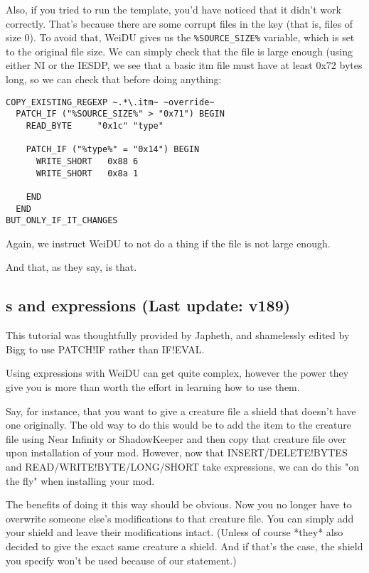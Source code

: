 \documentclass{article}
\def\ttref#1{\ahrefloc{#1}{\tt #1}}
\begin{document}
Also, if you tried to run the template, you'd have noticed that it didn't work
correctly. That's because there are some corrupt files in the key (that is,
files of size 0). To avoid that, WeiDU gives us the \verb+%SOURCE_SIZE%+ variable,
which is set to the original file size. We can simply check that the file is
large enough (using either NI or the IESDP, we see that a basic itm file must
have at least 0x72 bytes long, so we can check that before doing anything:

\begin{verbatim}
COPY_EXISTING_REGEXP ~.*\.itm~ ~override~
  PATCH_IF ("%SOURCE_SIZE%" > "0x71") BEGIN
    READ_BYTE     "0x1c" "type"
  
    PATCH_IF ("%type%" = "0x14") BEGIN
      WRITE_SHORT   0x88 6
      WRITE_SHORT   0x8a 1
  
    END
  END
BUT_ONLY_IF_IT_CHANGES
\end{verbatim}

Again, we instruct WeiDU to not do a thing if the file is not large enough.

And that, as they say, is that.

\subsection{\ttref{value}s and expressions  (Last update: v189)}
This tutorial was thoughtfully provided by Japheth, and shamelessly edited
by Bigg to use PATCH!IF rather than IF!EVAL.

Using expressions with WeiDU can get quite complex, however the power they
give you is more than worth the effort in learning how to use them.

Say, for instance, that you want to give a creature file a shield that
doesn't have one originally.  The old way to do this would be to add the
item to the creature file using Near Infinity or ShadowKeeper and then copy
that creature file over upon installation of your mod.  However, now that
INSERT/DELETE!BYTES and READ/WRITE!BYTE/LONG/SHORT take expressions, we can
do this "on the fly" when installing your mod.

The benefits of doing it this way should be obvious.  Now you no longer
have to overwrite someone else's modifications to that creature file.  You
can simply add your shield and leave their modifications intact.  (Unless
of course *they* also decided to give the exact same creature a shield.
And if that's the case, the shield you specify won't be used because of our
\ttref{PATCH!IF} statement.)
\end{document}
